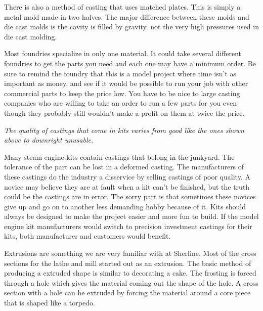 
There is also a method of casting that uses matched plates. This is simply a
metal mold made in two halves. The major difference between these molds and die
cast molds is the cavity is filled by gravity. not the very high pressures used
in die cast molding.


Most foundries specialize in only one material. It could take several different
foundries to get the parts you need and each one may have a minimum order. Be
sure to remind the foundry that this is a model project where time isn't as
important as money, and see if it would be possible to run your job with other
commercial parts to keep the price low. You have to be nice to large casting
companies who are willing to take an order to run a few parts for you even
though they probably still wouldn't make a profit on them at twice the price.

\bigskip
\textit{The quality of castings that come in kits varies from good like the ones
shown above to downright unusable.}
\bigskip


Many steam engine kits contain castings that belong in the junkyard. The
tolerance of the part can be lost in a deformed casting. The manufacturers of
these castings do the industry a disservice by selling castings of poor quality.
A novice may believe they are at fault when a kit can't be finished, but the
truth could be the castings are in error. The sorry part is that sometimes these
novices give up and go on to another less demanding hobby because of it. Kits
should always be designed to make the project easier and more fun to build. If
the model engine kit manufacturers would switch to precision investment castings
for their kits, both manufacturer and customers would benefit.

\secup

\secdown


Extrusions are something we are very familiar with at Sherline. Most of the
cross sections for the lathe and mill started out as an extrusion. The basic
method of producing a extruded shape is similar to decorating a cake. The
frosting is forced through a hole which gives the material coming out the shape
of the hole. A cross section with a hole can he extruded by forcing the material
around a core piece that is shaped like a torpedo.


